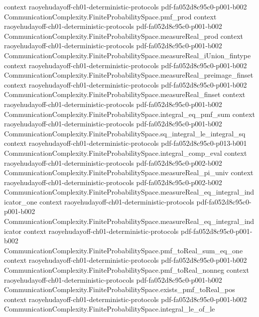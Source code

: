 \begin{theorem}
  {context}
  {raoyehudayoff-ch01-deterministic-protocols}
  {pdf-fa052d8c95c0-p001-b002}
\proofstep
  {CommunicationComplexity.FiniteProbabilitySpace.pmf_prod}
  {context}
  {raoyehudayoff-ch01-deterministic-protocols}
  {pdf-fa052d8c95c0-p001-b002}
\proofstep
  {CommunicationComplexity.FiniteProbabilitySpace.measureReal_prod}
  {context}
  {raoyehudayoff-ch01-deterministic-protocols}
  {pdf-fa052d8c95c0-p001-b002}
\proofstep
  {CommunicationComplexity.FiniteProbabilitySpace.measureReal_iUnion_fintype}
  {context}
  {raoyehudayoff-ch01-deterministic-protocols}
  {pdf-fa052d8c95c0-p001-b002}
\proofstep
  {CommunicationComplexity.FiniteProbabilitySpace.measureReal_preimage_finset}
  {context}
  {raoyehudayoff-ch01-deterministic-protocols}
  {pdf-fa052d8c95c0-p001-b002}
\proofstep
  {CommunicationComplexity.FiniteProbabilitySpace.measureReal_finset}
  {context}
  {raoyehudayoff-ch01-deterministic-protocols}
  {pdf-fa052d8c95c0-p001-b002}
\proofstep
  {CommunicationComplexity.FiniteProbabilitySpace.integral_eq_pmf_sum}
  {context}
  {raoyehudayoff-ch01-deterministic-protocols}
  {pdf-fa052d8c95c0-p001-b002}
\proofstep
  {CommunicationComplexity.FiniteProbabilitySpace.sq_integral_le_integral_sq}
  {context}
  {raoyehudayoff-ch01-deterministic-protocols}
  {pdf-fa052d8c95c0-p013-b001}
\proofstep
  {CommunicationComplexity.FiniteProbabilitySpace.integral_comp_eval}
  {context}
  {raoyehudayoff-ch01-deterministic-protocols}
  {pdf-fa052d8c95c0-p002-b002}
\proofstep
  {CommunicationComplexity.FiniteProbabilitySpace.measureReal_pi_univ}
  {context}
  {raoyehudayoff-ch01-deterministic-protocols}
  {pdf-fa052d8c95c0-p002-b002}
\proofstep
  {CommunicationComplexity.FiniteProbabilitySpace.measureReal_eq_integral_indicator_one}
  {context}
  {raoyehudayoff-ch01-deterministic-protocols}
  {pdf-fa052d8c95c0-p001-b002}
\proofstep
  {CommunicationComplexity.FiniteProbabilitySpace.measureReal_eq_integral_indicator}
  {context}
  {raoyehudayoff-ch01-deterministic-protocols}
  {pdf-fa052d8c95c0-p001-b002}
\proofstep
  {CommunicationComplexity.FiniteProbabilitySpace.pmf_toReal_sum_eq_one}
  {context}
  {raoyehudayoff-ch01-deterministic-protocols}
  {pdf-fa052d8c95c0-p001-b002}
\proofstep
  {CommunicationComplexity.FiniteProbabilitySpace.pmf_toReal_nonneg}
  {context}
  {raoyehudayoff-ch01-deterministic-protocols}
  {pdf-fa052d8c95c0-p001-b002}
\proofstep
  {CommunicationComplexity.FiniteProbabilitySpace.exists_pmf_toReal_pos}
  {context}
  {raoyehudayoff-ch01-deterministic-protocols}
  {pdf-fa052d8c95c0-p001-b002}
\proofstep
  {CommunicationComplexity.FiniteProbabilitySpace.integral_le_of_le}

\end{theorem}
